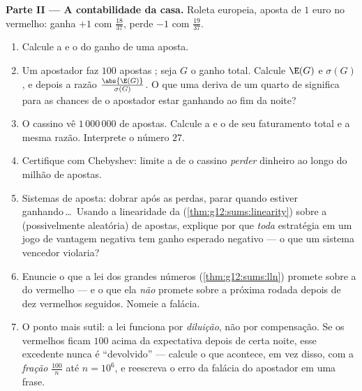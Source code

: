 \begin{problem}
\medskip
\noindent\textbf{Parte II --- A contabilidade da casa.}
Roleta europeia, aposta de $1$ euro no vermelho: ganha $+1$ com
 $\frac{18}{37}$, perde $-1$ com 
$\frac{19}{37}$.
\begin{enumerate}[resume]
  \item Calcule a  e o  do ganho de uma
        aposta.
  \item Um apostador faz $100$ apostas ; seja $G$
        o ganho total. Calcule $\E(G)$ e $\sigma(G)$, e depois a
        razão $\frac{\abs{\E(G)}}{\sigma(G)}$. O que uma deriva
        de um quarto de  significa para as chances
        de o apostador estar ganhando ao fim da noite?
  \item O cassino vê $1\,000\,000$ de apostas. Calcule a
         e o  de seu faturamento total e a
        mesma razão. Interprete o número $27$.
  \item Certifique com Chebyshev: limite a  de o
        cassino \emph{perder} dinheiro ao longo do milhão de
        apostas.
  \item Sistemas de aposta: dobrar após as perdas, parar quando
        estiver ganhando\,\dots\ Usando a linearidade da
         (\cref{thm:g12:sums:linearity}) sobre a
         (possivelmente aleatória) de apostas, explique
        por que \emph{toda} estratégia em um jogo de vantagem
        negativa tem ganho esperado negativo --- o que um
        sistema vencedor violaria?
  \item Enuncie o que a lei dos grandes números
        (\cref{thm:g12:sums:lln}) promete sobre a  do
        vermelho --- e o que ela \emph{não} promete sobre a
        próxima rodada depois de dez vermelhos seguidos. Nomeie
        a falácia.
  \item O ponto mais sutil: a lei funciona por \emph{diluição},
        não por compensação. Se os vermelhos ficam $100$ acima
        da expectativa depois de certa noite, esse excedente
        nunca é ``devolvido'' --- calcule o que acontece, em vez
        disso, com a \emph{fração} $\frac{100}{n}$ até
        $n = 10^6$, e reescreva o erro da falácia do apostador
        em uma frase.
\end{enumerate}


\end{problem}
